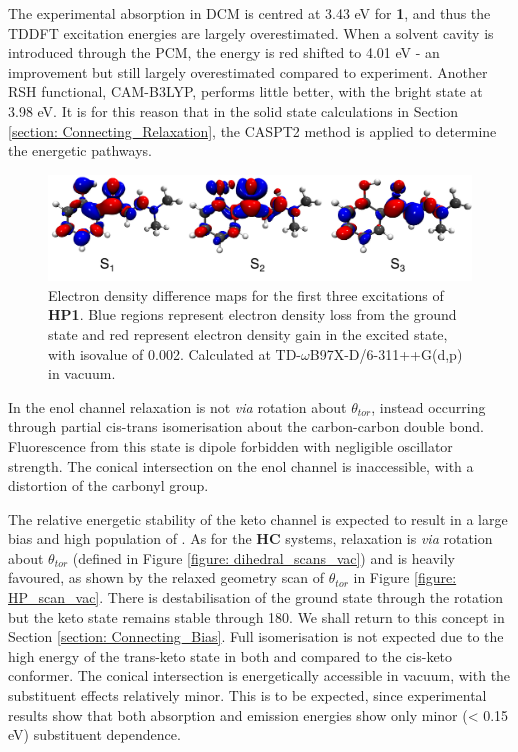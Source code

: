 The experimental absorption in DCM is centred at 3.43 eV for \textbf{1}, and thus the TDDFT excitation energies are largely overestimated. When a solvent cavity is introduced through the \ac{PCM}, the \sone{} energy is red shifted to 4.01 eV - an improvement but still largely overestimated compared to experiment. Another \ac{RSH} functional, CAM-B3LYP,\cite{Yanai2004} performs little better, with the bright state at 3.98 eV.  It is for this reason that in the solid state calculations in Section \ref{section: Connecting_Relaxation}, the CASPT2 method is applied to determine the energetic pathways.
\begin{figure}[t]
\centering
  \includegraphics[width=0.9\linewidth]{5ConnectingCrystalStructure/monomer_excitations.pdf}
  \caption[Electron density difference maps for the first three excitations of \textbf{HP1}.]{Electron density difference maps for the first three excitations of \textbf{HP1}. Blue regions represent electron density loss from the ground state and red represent electron density gain in the excited state, with isovalue of 0.002. Calculated at TD-$\omega$B97X-D/6-311++G(d,p) in vacuum.}
  \label{figure: monomer_excitations}
\end{figure}

In the enol channel relaxation is not \textit{via} rotation about $\theta_{tor}$, instead occurring through partial cis-trans isomerisation about the carbon-carbon double bond. Fluorescence from this state is dipole forbidden with negligible oscillator strength. The conical intersection on the enol channel is inaccessible, with a distortion of the carbonyl group. 

The relative energetic stability of the keto channel is expected to result in a large bias and high population of \Kstar{}. As for the \textbf{HC} systems, relaxation is \textit{via} rotation about $\theta_{tor}$ (defined in Figure \ref{figure: dihedral_scans_vac}) and is heavily favoured, as shown by the relaxed geometry scan of $\theta_{tor}$ in Figure \ref{figure: HP_scan_vac}. There is destabilisation of the ground state through the rotation but the keto state remains stable through 180\degree{}. We shall return to this concept in Section \ref{section: Connecting_Bias}. Full isomerisation is not expected due to the high energy of the trans-keto state in both \sone{} and \szero{} compared to the cis-keto conformer. The conical intersection is energetically accessible in vacuum, with the substituent effects relatively minor. This is to be expected, since experimental results show that both absorption and emission energies show only minor (\textless{} 0.15 eV) substituent dependence. 

